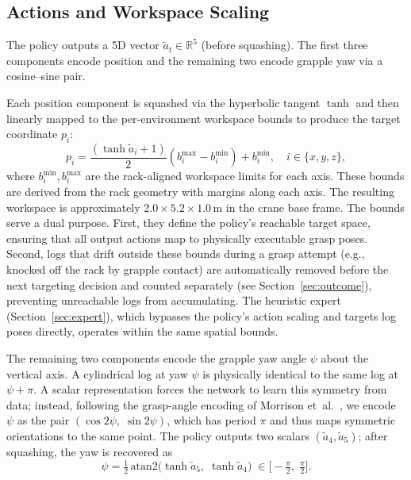 \documentclass[conference]{IEEEtran}
\begin{document}
\subsection{Actions and Workspace Scaling}
\label{sec:actions}
The policy outputs a 5D vector $\tilde{a}_t \in \mathbb{R}^5$ (before squashing).
The first three components encode position and the remaining two encode grapple yaw via a cosine--sine pair.

Each position component is squashed via the hyperbolic tangent $\tanh$ and then linearly mapped to the per-environment workspace bounds to produce the target coordinate $p_i$:
\begin{equation}
    p_i = \frac{(\tanh \tilde{a}_i + 1)}{2}(b_i^{\max} - b_i^{\min}) + b_i^{\min}, \quad i \in \{x,y,z\},
\end{equation}
where $b_i^{\min}, b_i^{\max}$ are the rack-aligned workspace limits for each axis.
These bounds are derived from the rack geometry with margins along each axis.
The resulting workspace is approximately $2.0 \times 5.2 \times 1.0$\,m in the crane base frame.
The bounds serve a dual purpose.
First, they define the policy's reachable target space, ensuring that all output actions map to physically executable grasp poses.
Second, logs that drift outside these bounds during a grasp attempt (e.g., knocked off the rack by grapple contact) are automatically removed before the next targeting decision and counted separately (see Section~\ref{sec:outcome}), preventing unreachable logs from accumulating.
The heuristic expert (Section~\ref{sec:expert}), which bypasses the policy's action scaling and targets log poses directly, operates within the same spatial bounds.

The remaining two components encode the grapple yaw angle $\psi$ about the vertical axis.
A cylindrical log at yaw $\psi$ is physically identical to the same log at $\psi + \pi$.
A scalar representation forces the network to learn this symmetry from data; instead, following the grasp-angle encoding of Morrison et~al.~\cite{morrison2018closing}, we encode $\psi$ as the pair $(\cos 2\psi,\;\sin 2\psi)$, which has period $\pi$ and thus maps symmetric orientations to the same point.
The policy outputs two scalars $(\tilde{a}_4, \tilde{a}_5)$; after squashing, the yaw is recovered as
\begin{equation}
    \psi = \tfrac{1}{2}\,\mathrm{atan2}\!\big(\tanh \tilde{a}_5,\;\tanh \tilde{a}_4\big) \;\in \big[-\tfrac{\pi}{2},\;\tfrac{\pi}{2}\big].
\end{equation}
\end{document}
